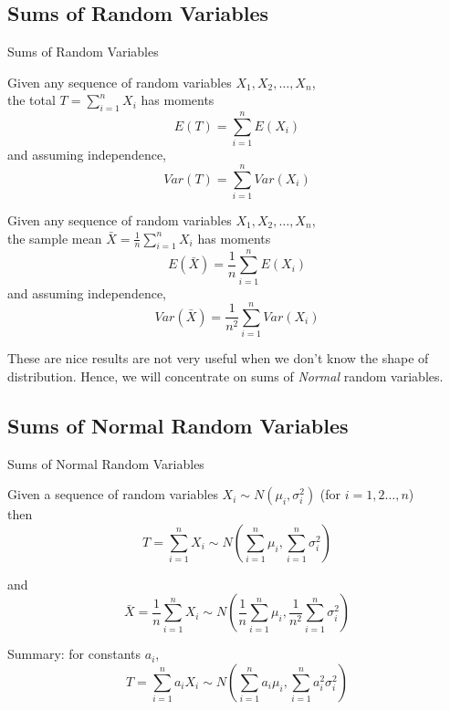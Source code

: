 \documentclass[t,xcolor=pdftex,dvipsnames,table]{beamer}
\begin{document}
\subsection[Sums]{Sums of Random Variables}

\begin{frame}{Sums of Random Variables}
\begin{definition}
Given any sequence of random variables $X_{1}, X_{2}, \ldots, X_{n}$, \\

the total $T = \sum_{i=1}^{n} X_{i}$ has moments
\[ \boxed{ E(T) = \sum_{i=1}^{n} E(X_{i})  } \]
and assuming independence,
\[ \boxed{ Var(T) = \sum_{i=1}^{n} Var(X_{i}) } \]

\end{definition}
\end{frame}

\begin{frame}{}
\begin{definition}
Given any sequence of random variables $X_{1}, X_{2}, \ldots, X_{n}$, \\

the sample mean $\bar{X} = \frac{1}{n} \sum_{i=1}^{n} X_{i}$ has moments
\[ \boxed{ E(\bar{X}) = \frac{1}{n} \sum_{i=1}^{n} E(X_{i}) } \]
and assuming independence,
\[ \boxed{ Var(\bar{X}) = \frac{1}{n^2} \sum_{i=1}^{n} Var(X_{i}) } \]
\end{definition}

These are nice results are not very useful when we don't know the shape of distribution. Hence, we will concentrate on sums of {\it Normal} random variables.
\end{frame}




\subsection[NormalSums]{Sums of Normal Random Variables}
\begin{frame}{Sums of Normal Random Variables}
\begin{definition}
Given a sequence of random variables $X_{i} \sim N(\mu_{i}, \sigma_{i}^2)$
(for $i=1,2\ldots,n$) \\

then  \[ \boxed{  T = \sum_{i=1}^{n} X_{i}  \sim N( \sum_{i=1}^{n} \mu_{i}, \sum_{i=1}^{n} \sigma_{i}^2    ) } \]

and
\[ \boxed{  \bar{X} = \frac{1}{n} \sum_{i=1}^{n} X_{i}  \sim N( \frac{1}{n} \sum_{i=1}^{n} \mu_{i}, \frac{1}{n^2} \sum_{i=1}^{n} \sigma_{i}^2  ) } \]

Summary: for constants $a_{i}$,
\[  \boxed{ T = \sum_{i=1}^{n}  a_{i} X_{i}  \sim N( \sum_{i=1}^{n} a_{i} \mu_{i}, \sum_{i=1}^{n} a_{i}^2
\sigma_{i}^2 ) } \]

\end{definition}
\end{frame}
\end{document}

